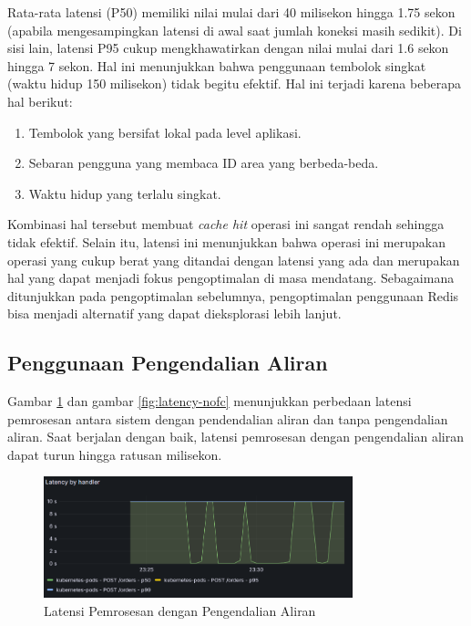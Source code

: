 Rata-rata latensi (P50) memiliki nilai mulai dari 40 milisekon hingga 1.75 sekon (apabila mengesampingkan latensi di awal saat jumlah koneksi masih sedikit). Di sisi lain, latensi P95 cukup mengkhawatirkan dengan nilai mulai dari 1.6 sekon hingga 7 sekon. Hal ini menunjukkan bahwa penggunaan tembolok singkat (waktu hidup 150 milisekon) tidak begitu efektif. Hal ini terjadi karena beberapa hal berikut:

\begin{enumerate}
    \item Tembolok yang bersifat lokal pada level aplikasi.
    \item Sebaran pengguna yang membaca ID area yang berbeda-beda.
    \item Waktu hidup yang terlalu singkat.
\end{enumerate}

Kombinasi hal tersebut membuat \textit{cache hit} operasi ini sangat rendah sehingga tidak efektif. Selain itu, latensi ini menunjukkan bahwa operasi ini merupakan operasi yang cukup berat yang ditandai dengan latensi yang ada dan merupakan hal yang dapat menjadi fokus pengoptimalan di masa mendatang. Sebagaimana ditunjukkan pada pengoptimalan sebelumnya, pengoptimalan penggunaan Redis bisa menjadi alternatif yang dapat dieksplorasi lebih lanjut.

\subsection{Penggunaan Pengendalian Aliran}

Gambar \ref{fig:latency-fc} dan gambar \ref{fig:latency-nofc} menunjukkan perbedaan latensi pemrosesan antara sistem dengan pendendalian aliran dan tanpa pengendalian aliran. Saat berjalan dengan baik, latensi pemrosesan dengan pengendalian aliran dapat turun hingga ratusan milisekon.

\begin{figure}[htbp]
    \centering
    \includegraphics[width=0.8\textwidth]{resources/chapter-4/latency-fc-pg-stress-0.png}
    \caption{Latensi Pemrosesan dengan Pengendalian Aliran}
    \label{fig:latency-fc}
\end{figure}

